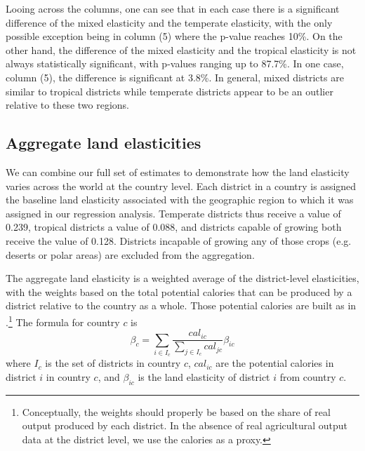 \documentclass[11pt]{article}
\begin{document}
Looing across the columns, one can see that in each case there is a significant difference of the mixed elasticity and the temperate elasticity, with the only possible exception being in column (5) where the p-value reaches 10\%. On the other hand, the difference of the mixed elasticity and the tropical elasticity is not always statistically significant, with p-values ranging up to 87.7\%. In one case, column (5), the difference is significant at 3.8\%. In general, mixed districts are similar to tropical districts while temperate districts appear to be an outlier relative to these two regions.

\subsection{Aggregate land elasticities}
We can combine our full set of estimates to demonstrate how the land elasticity varies across the world at the country level. Each district in a country is assigned the baseline land elasticity associated with the geographic region to which it was assigned in our regression analysis. Temperate districts thus receive a value of 0.239, tropical districts a value of 0.088, and districts capable of growing both receive the value of 0.128. Districts incapable of growing any of those crops (e.g. deserts or polar areas) are excluded from the aggregation. 

The aggregate land elasticity is a weighted average of the district-level elasticities, with the weights based on the total potential calories that can be produced by a district relative to the country as a whole. Those potential calories are built as in \citet{galorozak2016}.\footnote{Conceptually, the weights should properly be based on the share of real output produced by each district. In the absence of real agricultural output data at the district level, we use the calories as a proxy.} The formula for country $c$ is
\begin{equation}
 	\beta_c = \sum_{i \in I_c} \frac{cal_{ic}}{\sum_{j \in I_c} cal_{jc}} \beta_{ic}
 \end{equation} 
 where $I_c$ is the set of districts in country $c$, $cal_{ic}$ are the potential calories in district $i$ in country $c$, and $\beta_{ic}$ is the land elasticity of district $i$ from country $c$.
\end{document}
